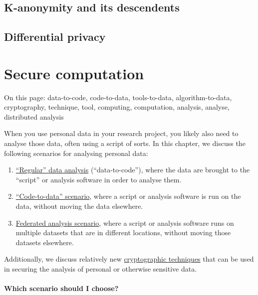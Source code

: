 \documentclass[
]{book}
\providecommand{\tightlist}{%
  \setlength{\itemsep}{0pt}\setlength{\parskip}{0pt}}
\begin{document}
\hypertarget{k-anonymity-and-its-descendents}{%
\section{K-anonymity and its descendents}\label{k-anonymity-and-its-descendents}}

\hypertarget{differential-privacy}{%
\section{Differential privacy}\label{differential-privacy}}

\hypertarget{secure-computation}{%
\chapter{Secure computation}\label{secure-computation}}

On this page: data-to-code, code-to-data, tools-to-data, algorithm-to-data,
cryptography, technique, tool, computing, computation, analysis, analyse,
distributed analysis

When you use personal data in your research project, you likely also need to
analyse those data, often using a script of sorts. In this chapter, we discuss
the following scenarios for analysing personal data:

\begin{enumerate}
\def\labelenumi{\arabic{enumi}.}
\tightlist
\item
  \protect\hyperlink{data-to-code}{``Regular'' data analysis} (``data-to-code''), where the data are
  brought to the ``script'' or analysis software in order to analyse them.
\item
  \protect\hyperlink{code-to-data}{``Code-to-data'' scenario}, where a script or analysis software
  is run on the data, without moving the data elsewhere.
\item
  \protect\hyperlink{federated-analysis}{Federated analysis scenario}, where a script or
  analysis software runs on multiple datasets that are in different locations,
  without moving those datasets elsewhere.
\end{enumerate}

Additionally, we discuss relatively new
\protect\hyperlink{computational-cryptography}{cryptographic techniques} that can be used in
securing the analysis of personal or otherwise sensitive data.

\hypertarget{which-scenario-should-i-choose}{%
\subsubsection{Which scenario should I choose?}\label{which-scenario-should-i-choose}}
\end{document}
